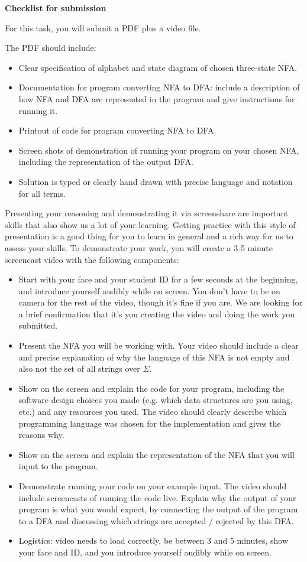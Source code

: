 \documentclass[12pt, oneside]{article}
\begin{document}
{\bf Checklist for submission}

For this task, you will submit a PDF plus a video file.

The PDF should include: 
\begin{itemize}
   \item Clear specification of alphabet and state diagram of chosen three-state NFA.
   \item Documentation for program converting NFA to DFA: include a description of how NFA and DFA are 
   represented in the program and give instructions for running it.
   \item Printout of code for program converting NFA to DFA.
   \item Screen shots of demonstration of running your program on your chosen NFA, including the representation
   of the output DFA.
   \item Solution is typed or clearly hand drawn with precise language and notation for all terms.
\end{itemize}

Presenting your reasoning and demonstrating it via screenshare are important skills that also 
show us a lot of your learning. Getting practice with this style of presentation is a good thing 
for you to learn in general and a rich way for us to assess your skills. 
To demonstrate your work, you will create a 3-5 minute screencast video with the following components:

\begin{itemize}
\item Start with your face and your student ID for a few seconds at the beginning, 
and introduce yourself audibly while on screen. You don't have to be on camera for the 
rest of the video, though it's fine if you are. We are looking for a brief confirmation that 
it's you creating the video and doing the work you submitted.
\item Present the NFA you will be working with. Your video should include a clear and precise 
explanation of why the language of this NFA is not empty and also not the set of all strings over $\Sigma$.
\item Show on the screen and explain the code for your program, including the software design choices you made
(e.g. which data structures are you using, etc.) and any resources you used. The video 
should clearly describe which programming language was chosen 
for the implementation and gives the reasons why.
\item Show on the screen and explain the representation of the NFA that you will input to the program.
\item Demonstrate running your code on your example input. The video should include screencasts of 
running the code live.
Explain why the output of your program is what you would expect, by connecting the output of the 
program to a DFA and discussing which strings are accepted / rejected by this DFA.
\item Logistics: video needs to load correctly, be between 3 and 5 minutes, 
show your face and ID, and you introduce yourself 
audibly while on screen.
\end{itemize}
\end{document}
